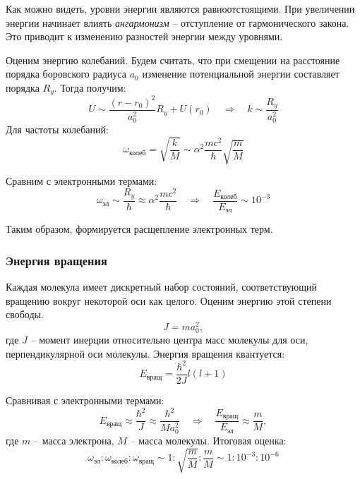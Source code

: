 \documentclass[12pt,a4paper]{article}
\begin{document}
	Как можно видеть, уровни энергии являются равноотстоящими. При увеличении энергии начинает влиять \textit{ангармонизм} -- отступление от гармонического закона. Это приводит к изменению разностей энергии между уровнями.
	
	Оценим энергию колебаний. Будем считать, что при смещении на расстояние порядка боровского радиуса $a_0$ изменение потенциальной энергии составляет порядка $R_y$. Тогда получим:
	\begin{equation}
		U \sim \frac{(r - r_0)^2}{a_0^2} R_y + U(r_0) \quad \Rightarrow \quad k \sim \frac{R_y}{a_0^2}
	\end{equation}
	Для частоты колебаний:
	\begin{equation}
		\omega_{\text{колеб}} = \sqrt{\frac{k}{M}} \sim \alpha^2 \frac{mc^2}{\hbar} \sqrt{\frac{m}{M}}
	\end{equation}
	
	Сравним с электронными термами:
	\begin{equation}
		\omega_{\text{эл}} \sim \frac{R_y}{\hbar} \approx \alpha^2 \frac{mc^2}{\hbar} \quad \Rightarrow \quad \frac{E_{\text{колеб}}}{E_{\text{эл}}} \sim 10^{-3}
	\end{equation}
	
	Таким образом, формируется расщепление электронных терм.
	
	\subsubsection*{Энергия вращения}
	
	Каждая молекула имеет дискретный набор состояний, соответствующий вращению вокруг некоторой оси как целого. Оценим энергию этой степени свободы.
	$$ J = ma_0^2, $$
	где $J$ -- момент инерции относительно центра масс молекулы для оси, перпендикулярной оси молекулы.
	Энергия вращения квантуется:
	$$ E_{\text{вращ}} = \frac{\hbar^2}{2J} l(l+1) $$
	
	Сравнивая с электронными термами:
	\begin{equation}
		E_{\text{вращ}} \approx \frac{\hbar^2}{J} \approx \frac{\hbar^2}{Ma_0^2} \quad \Rightarrow \quad \frac{E_{\text{вращ}}}{E_{\text{эл}}} \approx \frac{m}{M},
	\end{equation}
	где $m$ -- масса электрона, $M$ -- масса молекулы.
	Итоговая оценка:
	\begin{equation}
		\omega_{\text{эл}} : \omega_{\text{колеб}} : \omega_{\text{вращ}} \sim 1 : \sqrt{\frac{m}{M}} : \frac{m}{M} \sim 1 : 10^{-3} : 10^{-6}
		\label{eq:relation}
	\end{equation}
	
\end{document}
